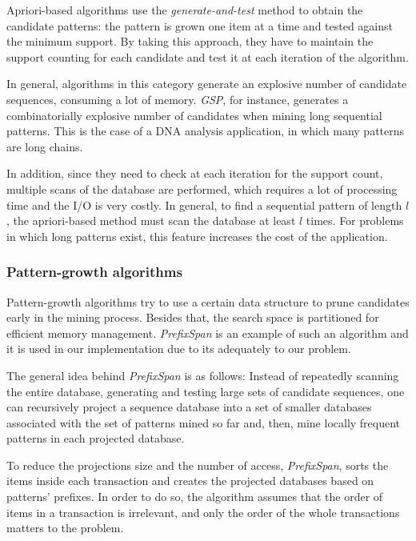 Apriori-based algorithms use the \textit{generate-and-test} method to obtain the candidate patterns: the pattern is grown one item at a time and tested against the minimum support. By taking this approach, they have to maintain the support counting for each candidate and test it at each iteration of the algorithm.

In general, algorithms in this category generate an explosive number of candidate sequences, consuming a lot of memory. \textit{GSP}, for instance, generates a combinatorially explosive number of candidates when mining long sequential patterns. This is the case of a DNA analysis application, in which many patterns are long chains.

In addition, since they need to check at each iteration for the support count, multiple scans of the database are performed, which requires a lot of processing time and the I/O is very costly. In general, to find a sequential pattern of length $l$, the apriori-based method must scan the database at least $l$ times. For problems in which long patterns exist, this feature increases the cost of the application.

\subsubsection{Pattern-growth algorithms}

Pattern-growth algorithms try to use a certain data structure to prune candidates early in the mining process. Besides that, the search space is partitioned for efficient memory management. \textit{PrefixSpan}\cite{Pei} is an example of such an algorithm and it is used in our implementation due to its adequately to our problem.

The general idea behind \textit{PrefixSpan} is as follows: Instead of repeatedly scanning the entire database, generating and testing large sets of candidate sequences, one can recursively project a sequence database into a set of smaller databases associated with the set of patterns mined so far and, then, mine locally frequent patterns in each projected database\cite{Pei}.

To reduce the projections size and the number of access, \textit{PrefixSpan}, sorts the items inside each transaction and creates the projected databases based on patterns' prefixes. In order to do so, the algorithm assumes that the order of items in a transaction is irrelevant, and only the order of the whole transactions matters to the problem.

